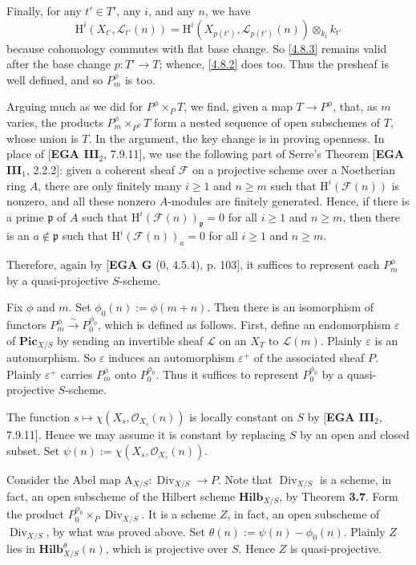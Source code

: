 \documentclass{article}
\newcommand{\Pic}{\mathbf{Pic}}
\newcommand{\Hilb}{\mathbf{Hilb}}
\newcommand{\Div}{\operatorname{Div}}
\begin{document}
Finally, for any $t' \in T'$, any $i$, and any $n$, we have
\[
\mathrm{H}^i(X_{t'}, \mathcal{L}_{t'}(n)) = \mathrm{H}^i(X_{p(t')}, \mathcal{L}_{p(t')}(n)) \otimes_{k_t} k_{t'}
\]
because cohomology commutes with flat base change. So \eqref{4.8.3} remains valid after the base change $p : T' \to T$; whence, \eqref{4.8.2} does too. Thus the presheaf is well defined, and so $P^{\phi}_m$ is too.

Arguing much as we did for $P^{\phi} \times_P T$, we find, given a map $T \to P^{\phi}$, that, as $m$ varies, the products $P^{\phi}_m \times_{P^{\phi}} T$ form a nested sequence of open subschemes of $T$, whose union is $T$. In the argument, the key change is in proving openness. In place of [\textbf{EGA III}$_2$, 7.9.11], we use the following part of Serre's Theorem [\textbf{EGA III}$_1$, 2.2.2]: given a coherent sheaf $\mathcal{F}$ on a projective scheme over a Noetherian ring $A$, there are only finitely many $i \ge 1$ and $n \ge m$ such that $\mathrm{H}^i(\mathcal{F}(n))$ is nonzero, and all these nonzero $A$-modules are finitely generated. Hence, if there is a prime $\mathfrak{p}$ of $A$ such that $\mathrm{H}^i(\mathcal{F}(n))_{\mathfrak{p}} = 0$ for all $i \ge 1$ and $n \ge m$, then there is an $a \notin \mathfrak{p}$ such that $\mathrm{H}^i(\mathcal{F}(n))_a = 0$ for all $i \ge 1$ and $n \ge m$.

Therefore, again by [\textbf{EGA G} (0, 4.5.4), p. 103], it suffices to represent each $P^{\phi}_m$ by a quasi-projective $S$-scheme.

Fix $\phi$ and $m$. Set $\phi_0(n) := \phi(m+n)$. Then there is an isomorphism of functors $P^{\phi}_m \xrightarrow{\sim} P^{\phi_0}_0$, which is defined as follows. First, define an endomorphism $\varepsilon$ of $\Pic_{X/S}$ by sending an invertible sheaf $\mathcal{L}$ on an $X_T$ to $\mathcal{L}(m)$. Plainly $\varepsilon$ is an automorphism. So $\varepsilon$ induces an automorphism $\varepsilon^+$ of the associated sheaf $P$. Plainly $\varepsilon^+$ carries $P^{\phi}_m$ onto $P^{\phi_0}_0$. Thus it suffices to represent $P^{\phi_0}_0$ by a quasi-projective $S$-scheme.

The function $s \mapsto \chi(X_s, \mathcal{O}_{X_s}(n))$ is locally constant on $S$ by [\textbf{EGA III}$_2$, 7.9.11]. Hence we may assume it is constant by replacing $S$ by an open and closed subset. Set $\psi(n) := \chi(X_s, \mathcal{O}_{X_s}(n))$.

Consider the Abel map $\mathrm{A}_{X/S} : \Div_{X/S} \to P$. Note that $\Div_{X/S}$ is a scheme, in fact, an open subscheme of the Hilbert scheme $\Hilb_{X/S}$, by Theorem \textbf{3.7}. Form the product $P^{\phi_0}_0 \times_P \Div_{X/S}$. It is a scheme $Z$, in fact, an open subscheme of $\Div_{X/S}$, by what was proved above. Set $\theta(n) := \psi(n) - \phi_0(n)$. Plainly $Z$ lies in $\Hilb_{X/S}^{\theta}(n)$, which is projective over $S$. Hence $Z$ is quasi-projective.
\end{document}
